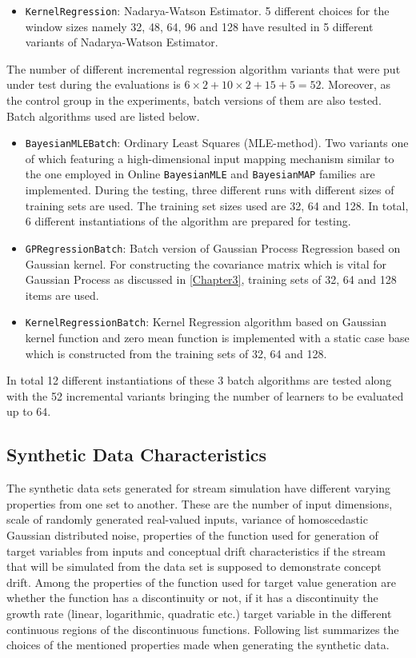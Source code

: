 \begin{itemize}
\item \texttt{KernelRegression}: Nadarya-Watson Estimator. 5 different choices for the window sizes namely 32, 48, 64, 96 and 128 have resulted in 5 different variants of Nadarya-Watson Estimator.
\end{itemize}

The number of different incremental regression algorithm variants that were put under test during the evaluations is $6\times 2 + 10\times 2 + 15 + 5 = 52$. Moreover, as the control group in the experiments, batch versions of them are also tested. Batch algorithms used are listed below.

\begin{itemize}
\item \texttt{BayesianMLEBatch}: Ordinary Least Squares (MLE-method). Two variants one of which featuring a high-dimensional input mapping mechanism similar to the one employed in Online \texttt{BayesianMLE} and \texttt{BayesianMAP} families are implemented. During the testing, three different runs with different sizes of training sets are used. The training set sizes used are 32, 64 and 128. In total, 6 different instantiations of the algorithm are prepared for testing.
\item \texttt{GPRegressionBatch}: Batch version of Gaussian Process Regression based on Gaussian kernel. For constructing the covariance matrix which is vital for Gaussian Process as discussed in \ref{Chapter3}, training sets of 32, 64 and 128 items are used.
\item \texttt{KernelRegressionBatch}: Kernel Regression algorithm based on Gaussian kernel function and zero mean function is implemented with a static case base which is constructed from the training sets of 32, 64 and 128.
\end{itemize}

In total 12 different instantiations of these 3 batch algorithms are tested along with the 52 incremental variants bringing the number of learners to be evaluated up to $64$.

\subsection{Synthetic Data Characteristics}

The synthetic data sets generated for stream simulation have different varying properties from one set to another. These are the number of input dimensions, scale of randomly generated real-valued inputs, variance of homoscedastic Gaussian distributed noise, properties of the function used for generation of target variables from inputs and conceptual drift characteristics if the stream that will be simulated from the data set is supposed to demonstrate concept drift. Among the properties of the function used for target value generation are whether the function has a discontinuity or not, if it has a discontinuity the growth rate (linear, logarithmic, quadratic etc.) target variable in the different continuous regions of the discontinuous functions. Following list summarizes the choices of the mentioned properties made when generating the synthetic data.

